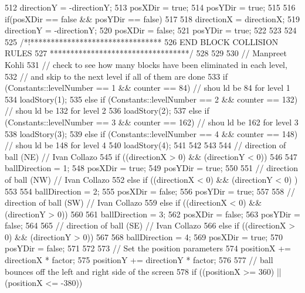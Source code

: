 \begin{DoxyCode}
{{{{{{512                         directionY = -directionY;
513                         posXDir = true;
514                         posYDir = true;
515                     }
516                     if(posXDir == false && posYDir == false)
517                     {
518                         directionX = directionX;
519                         directionY = -directionY;
520                         posXDir = false;
521                         posYDir = true;
522                     }
523                 }
524 
525                       /*!********************************
526                              END BLOCK COLLISION RULES
527                        **********************************/
528             }
529 
530             // Manpreet Kohli
531             // check to see how many blocks have been eliminated in each level,
532             // and skip to the next level if all of them are done
533             if (Constants::levelNumber == 1 && counter == 84)             // shou
      ld be 84 for level 1
534                 loadStory(1);
535             else if (Constants::levelNumber == 2 && counter == 132)       // shou
      ld be 132 for level 2
536                 loadStory(2);
537             else if (Constants::levelNumber == 3 && counter == 162)       // shou
      ld be 162 for level 3
538                 loadStory(3);
539             else if (Constants::levelNumber == 4 && counter == 148)       // shou
      ld be 148 for level 4
540                 loadStory(4);
541         }
542     }
543 
544     // direction of ball (NE) // Ivan Collazo
545     if ((directionX > 0) && (directionY < 0))
546     {
547         ballDirection = 1;
548         posXDir = true;
549         posYDir = true;
550     }
551     // direction of ball (NW) // Ivan Collazo
552     else if ((directionX < 0) && (directionY < 0) )
553     {
554         ballDirection = 2;
555         posXDir = false;
556         posYDir = true;
557     }
558     // direction of ball (SW) // Ivan Collazo
559     else if ((directionX < 0) && (directionY > 0))
560     {
561         ballDirection = 3;
562         posXDir = false;
563         posYDir = false;
564     }
565     // direction of ball (SE) // Ivan Collazo
566     else if ((directionX > 0) && (directionY > 0))
567     {
568         ballDirection = 4;
569         posXDir = true;
570         posYDir = false;
571     }
572 
573     // Set the position parameters
574     positionX += directionX * factor;
575     positionY += directionY * factor;
576 
577     // ball bounces off the left and right side of the screen
578     if ((positionX >= 360) || (positionX <= -380))
}
\end{DoxyCode}
